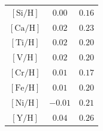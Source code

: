 \documentclass[12pt,letterpaper,margin=1in]{article}
\newcommand{\acronym}[1]{{\small{#1}}}
\newcommand{\tgas}{\acronym{TGAS}}
\newcommand*\elem[1]{\ensuremath{\mathrm{#1}}}
\newcommand*\elemH[1]{\ensuremath{[\mathrm{#1}/\elem{H}]}}
\newcommand{\todo}[1]{{TODO: #1}}
\begin{document}
\begin{table}[htpb]
\begin{tabular}{ccc}
$\elemH{Si}$                              & $0.00$            & $0.16$            \\
$\elemH{Ca}$                              & $0.02$            & $0.23$            \\
$\elemH{Ti}$                              & $0.02$            & $0.20$            \\
$\elemH{V}$                               & $0.02$            & $0.20$            \\
$\elemH{Cr}$                              & $0.01$            & $0.17$            \\
$\elemH{Fe}$                              & $0.01$            & $0.20$            \\
$\elemH{Ni}$                              & $-0.01$           & $0.21$            \\
$\elemH{Y}$                               & $0.04$            & $0.26$            \\
\hline\hline
\end{tabular}
%
\end{table}
\end{document}
